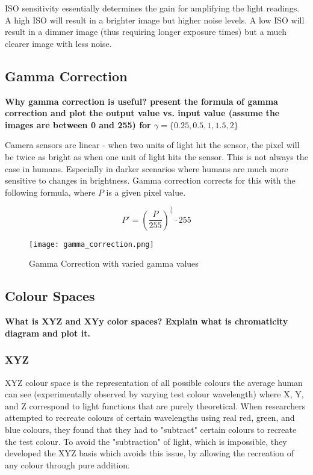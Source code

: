 \documentclass[12pt, letterpaper]{article}
\begin{document}
ISO sensitivity essentially determines the gain for amplifying the light readings. A high ISO will result in a brighter image but higher noise levels. A low ISO will result in a dimmer image (thus requiring longer exposure times) but a much clearer image with less noise.

\subsection{Gamma Correction}
\textbf{Why gamma correction is useful? present the formula of gamma correction and plot the output value vs. input
value (assume the images are between 0 and 255) for $\gamma = \{0.25,0.5,1,1.5,2\}$}

Camera sensors are linear - when two units of light hit the sensor, the pixel will be twice as bright as when one unit of light hits the sensor. This is not always the case in humans. Especially in darker scenarios where humans are much more sensitive to changes in brightness. Gamma correction corrects for this with the following formula, where $P$ is a given pixel value.

\[ P' =  (\frac{P}{255}) ^ {\frac{1}{\gamma}} \cdot 255\]

\vspace{.5cm}

\begin{figure}[h]
    \centering
    \texttt{[image: gamma\_correction.png]}
    \caption{Gamma Correction with varied gamma values}
    \label{fig:gamma}
\end{figure}

\subsection{Colour Spaces}
\textbf{What is XYZ and XYy color spaces? Explain what is chromaticity diagram and plot it.}

\subsubsection{XYZ}

XYZ colour space is the representation of all possible colours the average human can see (experimentally observed by varying test colour wavelength) where X, Y, and Z correspond to light functions that are purely theoretical. When researchers attempted to recreate colours of certain wavelengths using real red, green, and blue colours, they found that they had to "subtract" certain colours to recreate the test colour. To avoid the "subtraction" of light, which is impossible, they developed the XYZ basis which avoids this issue, by allowing the recreation of any colour through pure addition.
\end{document}
